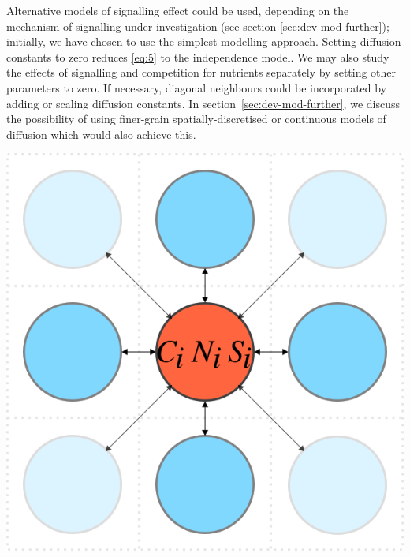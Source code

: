 Alternative models of signalling effect could be used, depending on
the mechanism of signalling under investigation (see section
\ref{sec:dev-mod-further}); initially, we have chosen to use the
simplest modelling approach. Setting diffusion constants to zero
reduces \ref{eq:5} to the independence model. We may also study the
effects of signalling and competition for nutrients separately by
setting other parameters to zero. If necessary, diagonal neighbours
could be incorporated by adding or scaling diffusion constants. In
section~\ref{sec:dev-mod-further}, we discuss the possibility of using
finer-grain spatially-discretised or continuous models of diffusion
which would also achieve this.

\begin{Figure}
  \centering
  \includegraphics[width=\linewidth]{square_array}
  \label{fig:simple_model}
\end{Figure}

